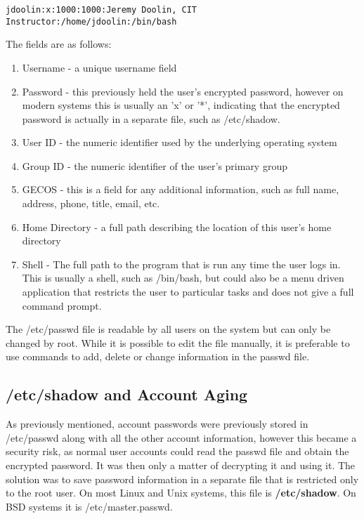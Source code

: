\begin{verbatim}
jdoolin:x:1000:1000:Jeremy Doolin, CIT Instructor:/home/jdoolin:/bin/bash
\end{verbatim}

The fields are as follows:

\begin{enumerate}
\item Username - a unique username field
\item Password - this previously held the user's encrypted password, however on modern systems this is usually an 'x' or '*', indicating that the encrypted password is actually in a separate file, such as /etc/shadow.
\item User ID - the numeric identifier used by the underlying operating system
\item Group ID - the numeric identifier of the user's primary group
\item GECOS - this is a field for any additional information, such as full name, address, phone, title, email, etc.
\item Home Directory - a full path describing the location of this user's home directory
\item Shell - The full path to the program that is run any time the user logs in.  This is usually a shell, such as /bin/bash, but could also be a menu driven application that restricts the user to particular tasks and does not give a full command prompt.
\end{enumerate}

The /etc/passwd file is readable by all users on the system but can only be changed by root.  While it is possible to edit the file manually, it is preferable to use commands to add, delete or change information in the passwd file.

\subsection{/etc/shadow and Account Aging}

As previously mentioned, account passwords were previously stored in /etc/passwd along with all the other account information, however this became a security risk, as normal user accounts could read the passwd file and obtain the encrypted password.  It was then only a matter of decrypting it and using it.  The solution was to save password information in a separate file that is restricted only to the root user.  On most Linux and Unix systems, this file is \textbf{/etc/shadow}.  On BSD systems it is /etc/master.passwd.\\

